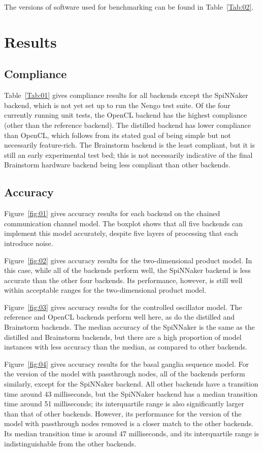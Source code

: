 \documentclass{frontiersSCNS}
\begin{document}
The versions of software
used for benchmarking can be found in
Table~\ref{Tab:02}.

\section{Results}

\subsection{Compliance}

Table~\ref{Tab:01} gives compliance results for
all backends except the SpiNNaker backend,
which is not yet set up to run the Nengo test suite.
Of the four currently running unit tests,
the OpenCL backend has the highest compliance
(other than the reference backend).
The distilled backend has lower compliance
than OpenCL, which follows from its stated goal
of being simple but not necessarily feature-rich.
The Brainstorm backend is the least compliant,
but it is still an early experimental test bed;
this is not necessarily indicative of the
final Brainstorm hardware backend being
less compliant than other backends.

\subsection{Accuracy}

Figure~\ref{fig:01} gives accuracy results
for each backend on the chained communication channel model.
The boxplot shows that all five backends can
implement this model accurately,
despite five layers of processing
that each introduce noise.

Figure~\ref{fig:02} gives accuracy results
for the two-dimensional product model.
In this case, while all of the backends
perform well, the SpiNNaker backend
is less accurate than the other four backends.
Its performance, however, is still well within
acceptable ranges for the two-dimensional product model.

Figure~\ref{fig:03} gives accuracy results
for the controlled oscillator model.
The reference and OpenCL backends perform well here,
as do the distilled and Brainstorm backends.
The median accuracy of the SpiNNaker is
the same as the distilled and Brainstorm backends,
but there are a high proportion of model instances
with less accuracy than the median,
as compared to other backends.

Figure~\ref{fig:04} gives accuracy results
for the basal ganglia sequence model.
For the version of the model with passthrough nodes,
all of the backends perform similarly,
except for the SpiNNaker backend.
All other backends have a transition time
around 43 milliseconds,
but the SpiNNaker backend has a median transition time
around 51 milliseconds;
its interquartile range
is also significantly larger
than that of other backends.
However, its performance for
the version of the model
with passthrough nodes removed
is a closer match to the other backends.
Its median transition time
is around 47 milliseconds,
and its interquartile range
is indistinguishable from the other backends.
\end{document}
